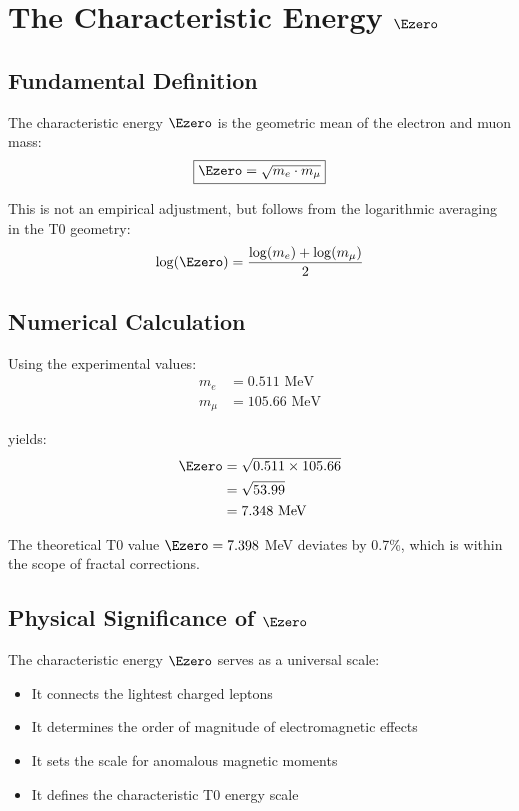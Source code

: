 	\section{The Characteristic Energy $\Ezero$}
	
	\subsection{Fundamental Definition}
	
	The characteristic energy $\Ezero$ is the geometric mean of the electron and muon mass:
	\begin{equation}
		\boxed{\Ezero = \sqrt{m_e \cdot m_\mu}}
		\label{eq:E0_fundamental}
	\end{equation}
	
	This is not an empirical adjustment, but follows from the logarithmic averaging in the T0 geometry:
	\begin{equation}
		\log(\Ezero) = \frac{\log(m_e) + \log(m_\mu)}{2}
		\label{eq:E0_logarithmic}
	\end{equation}
	
	\subsection{Numerical Calculation}
	
	Using the experimental values:
	\begin{align}
		m_e &= 0.511 \text{ MeV}\\
		m_\mu &= 105.66 \text{ MeV}
	\end{align}
	
	yields:
	\begin{align}
		\Ezero &= \sqrt{0.511 \times 105.66}\\
		&= \sqrt{53.99}\\
		&= 7.348 \text{ MeV}
	\end{align}
	
	The theoretical T0 value $\Ezero = 7.398$ MeV deviates by 0.7\%, which is within the scope of fractal corrections.
	
	\subsection{Physical Significance of $\Ezero$}
	
	The characteristic energy $\Ezero$ serves as a universal scale:
	\begin{itemize}
		\item It connects the lightest charged leptons
		\item It determines the order of magnitude of electromagnetic effects
		\item It sets the scale for anomalous magnetic moments
		\item It defines the characteristic T0 energy scale
	\end{itemize}
	
